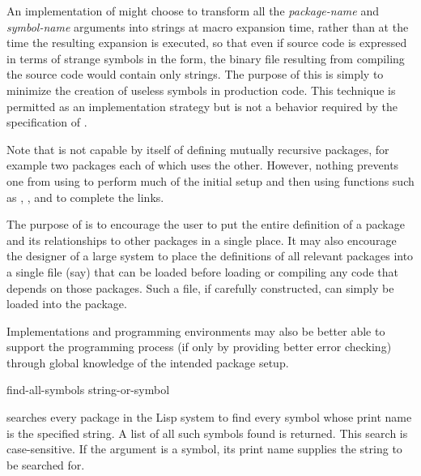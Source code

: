 \begin{new}
\begin{defmac}
\beforenoterule
\begin{implementation}
An implementation of  might choose to transform
all the {\it package-name} and {\it symbol-name} arguments
into strings at macro expansion time, rather than at the time
the resulting expansion is executed, so that even if source code
is expressed in terms of strange symbols in the  form,
the binary file resulting from compiling the source code would
contain only strings.  The purpose of this is simply to minimize
the creation of useless symbols in production code.  This technique
is permitted as an implementation strategy but is not a
behavior required by the specification of .
\end{implementation}
\afternoterule

Note that  is not capable by itself of defining
mutually recursive packages, for example two packages each of
which uses the other.  However, nothing prevents one from using
 to perform much of the initial setup and then
using functions such as , , and 
to complete the links.

The purpose of  is to encourage the user to
put the entire definition of a package and its relationships to
other packages in a single place.  It may also encourage the designer
of a large system to place the definitions of all relevant packages
into a single file (say) that can be loaded before loading or compiling
any code that depends on those packages.  Such a file, if carefully
constructed, can simply be loaded into the  package.

Implementations and programming environments may also be better able
to support the programming process (if only by providing better
error checking) through global knowledge of the intended package setup.
\end{defmac}
\end{new}

\begin{defun}[Function]
find-all-symbols string-or-symbol

searches every package in the Lisp system to find
every symbol whose print name is the
specified string.  A list of all such symbols found is returned.
This search is case-sensitive.
If the argument is a symbol, its print name supplies
the string to be searched for.
\end{defun}

